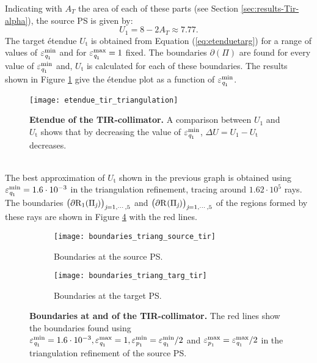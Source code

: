 Indicating with $A_T$ the area of each of these parts (see Section \ref{sec:results-Tir-alpha}), the source PS is given by:
\begin{equation}
U_1 = 8-2A_T\approx 7.77.
\end{equation}
The target \'{e}tendue $U_{\textrm{t}}$ is obtained from Equation (\ref{eq:etenduetarg}) for a range of values of $\varepsilon_{\textit{q}_1}^{\textrm{min}}$ and for $\varepsilon_{\textit{q}_1}^{\textrm{max}}=1$ fixed. The boundaries $\partial$$(\Pi)$ are found for every value of $\varepsilon_{\textit{q}_1}^{\textrm{min}}$ and, $U_{\textrm{t}}$ is calculated for each of these boundaries. 
The results shown in Figure \ref{fig:etendue_tir_triangulation} give the \'{e}tendue plot as a function of $\varepsilon_{\textit{q}_{1}}^{\textrm{min}}$.
 \begin{figure}[t]
  \center
  \texttt{[image: etendue\_tir\_triangulation]}
  \caption{\textbf{Etendue of the TIR-collimator.} A comparison between $U_1$ and $U_{\textrm{t}}$ shows that by decreasing the value of $\varepsilon_{\textit{q}_{1}}^{\textrm{min}}$, $\Delta U= U_1-U_{\textrm{t}}$ decreases.}
  \label{fig:etendue_tir_triangulation}
\end{figure}
\\ \indent 
The best approximation of $U_{\textrm{t}}$ shown in the previous graph is obtained using $\varepsilon_{\textit{q}_1}^{\textrm{min}}=1.6\cdot 10^{-3}$ in the triangulation refinement, tracing around $1.62 \cdot 10^5$ rays. The boundaries $\big(\partial\mbox{$\textup{R}_{\textit{$1$}}$}(\Pi_{\textit{j}})\big)_{\textit{j} = 1, \cdots, 5}$ and $\big(\partial\mbox{$\textup{R}_{\textit{}}$}(\Pi_{\textit{j}})\big)_{\textit{j} = 1, \cdots, 5}$ of the regions formed by these rays are shown in Figure \ref{fig:boundaries_TIR_triangulation} with the red lines. 
\begin{figure}[h]
 \begin{subfigure}[t]{0.5\textwidth}
\centering
    \texttt{[image: boundaries\_triang\_source\_tir]}
    \caption{Boundaries at the source PS.}
    \label{fig:boundaries_triang_source_tir}
\end{subfigure}
\hfill
\begin{subfigure}[t]{0.5\textwidth}
\centering
    \texttt{[image: boundaries\_triang\_targ\_tir]}
    \caption{Boundaries at the target PS.}
    \label{fig:boundaries_triang_target_tir}
\end{subfigure}
\caption{\textbf{Boundaries at  and  of the TIR-collimator.} The red lines show the boundaries found using $\varepsilon_{\textit{q}_1}^{\textrm{min}}=1.6\cdot 10^{-3}, \varepsilon_{\textit{q}_1}^{\textrm{max}}=1, \varepsilon_{\textit{p}_1}^{\textrm{min}}=\varepsilon_{\textit{q}_1}^{\textrm{min}}/2$ and $\varepsilon_{\textit{p}_1}^{\textrm{max}} = \varepsilon_{\textit{q}_1}^{\textrm{max}}/2$ in the triangulation refinement of the source PS.}
 \label{fig:boundaries_TIR_triangulation}
\end{figure}

